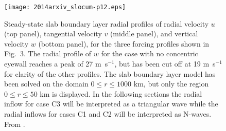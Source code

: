 \documentclass[10pt]{article}
\begin{document}
\begin{figure}[b!t]                  %
\centerline{\texttt{[image: 2014arxiv\_slocum-p12.eps]}}
\caption{Steady-state slab boundary layer radial profiles of radial velocity
$u$ (top panel), tangential velocity $v$ (middle panel), and vertical velocity
$w$ (bottom panel), for the three forcing profiles shown in Fig.~3. The
radial profile of $w$ for the case with no concentric eyewall reaches a peak
of 27 m~s$^{-1}$, but has been cut off at 19 m~s$^{-1}$ for clarity of the
other profiles. The slab boundary layer model has been solved on the domain
$0 \le r \le 1000$ km, but only the region $0 \le r \le 50$ km is displayed.
In the following sections the radial inflow for case C3 will be interpreted
as a triangular wave while the radial inflows for cases C1 and C2 will be
interpreted as N-waves. From \citet{slocum14}.}
\end{figure}
\end{document}
